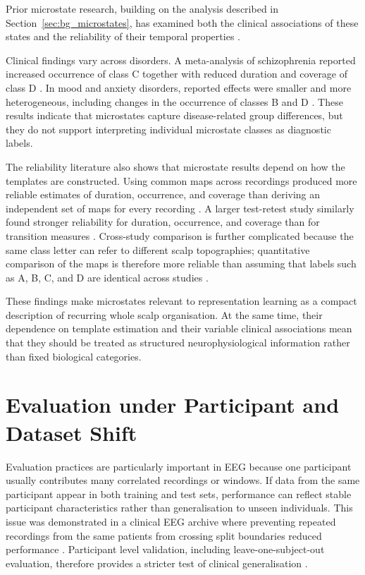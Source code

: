 Prior microstate research, building on the analysis described in Section~\ref{sec:bg_microstates}, has examined both the clinical associations of these states and the reliability of their temporal properties \parencite{khannaMicrostatesRestingstateEEG2015}.

Clinical findings vary across disorders. A meta-analysis of schizophrenia reported increased occurrence of class C together with reduced duration and coverage of class D \parencite{rieger15YearsMicrostateResearch2016}. In mood and anxiety disorders, reported effects were smaller and more heterogeneous, including changes in the occurrence of classes B and D \parencite{chivuEEGMicrostatesMoodAnxiety2023}. These results indicate that microstates capture disease-related group differences, but they do not support interpreting individual microstate classes as diagnostic labels.

The reliability literature also shows that microstate results depend on how the templates are constructed. Using common maps across recordings produced more reliable estimates of duration, occurrence, and coverage than deriving an independent set of maps for every recording \parencite{khannaReliabilityRestingStateMicrostate2014a}. A larger test-retest study similarly found stronger reliability for duration, occurrence, and coverage than for transition measures \parencite{kleinertReliabilityEEGMicrostate2023}. Cross-study comparison is further complicated because the same class letter can refer to different scalp topographies; quantitative comparison of the maps is therefore more reliable than assuming that labels such as A, B, C, and D are identical across studies \parencite{koenigEEGMetaMicrostates2023}.

These findings make microstates relevant to representation learning as a compact description of recurring whole scalp organisation. At the same time, their dependence on template estimation and their variable clinical associations mean that they should be treated as structured neurophysiological information rather than fixed biological categories.

\section{Evaluation under Participant and Dataset Shift}\label{sec:rel_evaluation}

Evaluation practices are particularly important in EEG because one participant usually contributes many correlated recordings or windows. If data from the same participant appear in both training and test sets, performance can reflect stable participant characteristics rather than generalisation to unseen individuals. This issue was demonstrated in a clinical EEG archive where preventing repeated recordings from the same patients from crossing split boundaries reduced performance \parencite{kimDeepLearningBasedEEG2023}. Participant level validation, including leave-one-subject-out evaluation, therefore provides a stricter test of clinical generalisation \parencite{miltiadousDICENetNovelConvolution2023}.

